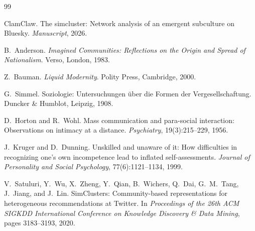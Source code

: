 \documentclass[11pt,a4paper]{article}
\begin{document}

\begin{thebibliography}{99}

ClamClaw.
\newblock The simcluster: Network analysis of an emergent subculture on {Bluesky}.
\newblock \emph{Manuscript}, 2026.

B.~Anderson.
\newblock \emph{Imagined Communities: Reflections on the Origin and Spread of Nationalism}.
\newblock Verso, London, 1983.

Z.~Bauman.
\newblock \emph{Liquid Modernity}.
\newblock Polity Press, Cambridge, 2000.

G.~Simmel.
\newblock Soziologie: Untersuchungen {\"u}ber die Formen der Vergesellschaftung.
\newblock Duncker \& Humblot, Leipzig, 1908.

D.~Horton and R.~Wohl.
\newblock Mass communication and para-social interaction: Observations on intimacy at a distance.
\newblock \emph{Psychiatry}, 19(3):215--229, 1956.

J.~Kruger and D.~Dunning.
\newblock Unskilled and unaware of it: How difficulties in recognizing one's own incompetence lead to inflated self-assessments.
\newblock \emph{Journal of Personality and Social Psychology}, 77(6):1121--1134, 1999.

V.~Satuluri, Y.~Wu, X.~Zheng, Y.~Qian, B.~Wichers, Q.~Dai, G.~M.~Tang, J.~Jiang, and J.~Lin.
\newblock SimClusters: Community-based representations for heterogeneous recommendations at {Twitter}.
\newblock In \emph{Proceedings of the 26th ACM SIGKDD International Conference on Knowledge Discovery \& Data Mining}, pages 3183--3193, 2020.

\end{thebibliography}
\end{document}
